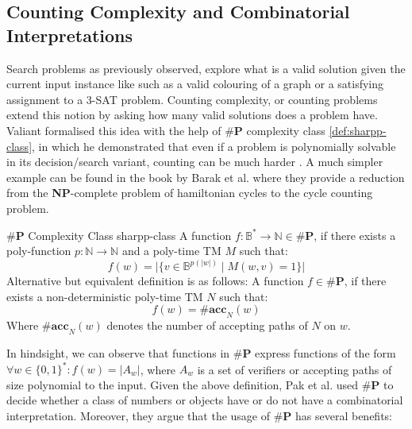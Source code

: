 


\subsection{Counting Complexity and Combinatorial Interpretations}

Search problems as previously observed, explore what is a valid solution given the current input instance like
such as a valid colouring of a graph or a satisfying assignment to a 3-SAT problem. Counting complexity,
or counting problems extend this notion by asking how many valid solutions does a problem have.
Valiant formalised this idea with the help of $\textbf{\#P}$ complexity class \ref{def:sharpp-class}, in which
he demonstrated that even if a problem is polynomially solvable in its decision/search variant, counting can be
much harder \cite{valiant_ComplexityComputingPermanent_1979}.
A much simpler example can be found in the book by Barak et al. \cite{arora_ComputationalComplexityModern_2009}
where they provide a reduction from the \textbf{NP}-complete problem of hamiltonian cycles to
the cycle counting problem.


\begin{definitionbox}{\(\textbf{\#P}\) Complexity Class \cite{valiant_ComplexityComputingPermanent_1979}}{sharpp-class}
    A function \(f: \mathbb{B}^* \to \mathbb{N} \in \textbf{\#P}\), if there exists a
    poly-function \(p : \mathbb{N} \to \mathbb{N}\) and a poly-time TM \(M\) such that:
    \[
        f(w) = \Big|\Big\{v \in \mathbb{B}^{p(|w|)} \mid M(w, v) =1 \Big\}\Big|
    \]
    Alternative but equivalent definition is as follows: A function $f \in \textbf{\#P}$,
    if there exists a non-deterministic poly-time TM $N$ such that:
    $$
        f(w) = \textbf{\#acc}_N(w)
    $$
    Where $\textbf{\#acc}_N(w)$ denotes the number of accepting paths of $N$ on $w$.
\end{definitionbox}

In hindsight, we can observe that functions in $\textbf{\#P}$ express functions of the form
$\forall w \in \{0,1\}^*: f(w) = |A_w|$, where $A_w$ is a set of verifiers or accepting paths of size
polynomial to the input.
Given the above definition, Pak et al. \cite{pak_WhatCombinatorialInterpretation_2022, ikenmeyer_PositivitySymmetricGroup_2024,ikenmeyer_WhatWhatNot_2022}
used $\textbf{\#P}$ to decide whether a class of numbers or objects have or do not have a combinatorial interpretation.
Moreover, they argue that the usage of $\textbf{\#P}$ has several benefits:

